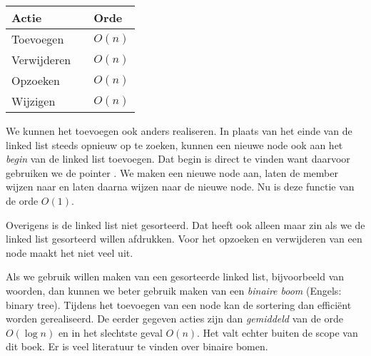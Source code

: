 \begin{table}[!ht]
\begin{tabular}{lp{1em}l}
Actie && Orde \\
\midrule
Toevoegen && $O(n)$ \\
Verwijderen && $O(n)$ \\
Opzoeken && $O(n)$ \\
Wijzigen && $O(n)$
\end{tabular}
\end{table}
\basic

We kunnen het toevoegen ook anders realiseren. In plaats van het einde van de linked list steeds opnieuw op te zoeken, kunnen een nieuwe node ook aan het \textsl{begin} van de linked list toevoegen. Dat begin is direct te vinden want daarvoor gebruiken we de pointer . We maken een nieuwe node aan, laten de member  wijzen naar  en laten daarna  wijzen naar de nieuwe node. Nu is deze functie van de orde $O(1)$.

Overigens is de linked list niet gesorteerd. Dat heeft ook alleen maar zin als we de linked list gesorteerd willen afdrukken. Voor het opzoeken en verwijderen van een node maakt het niet veel uit.

Als we gebruik willen maken van een gesorteerde linked list, bijvoorbeeld van woorden, dan kunnen we beter gebruik maken van een \textsl{binaire boom} (Engels: binary tree). Tijdens het toevoegen van een node kan de sortering dan efficiënt worden gerealiseerd. De eerder gegeven acties zijn dan \textsl{gemiddeld} van de orde $O(\log n)$ en in het slechtste geval $O(n)$. Het valt echter buiten de scope van dit boek. Er is veel literatuur te vinden over binaire bomen. 
